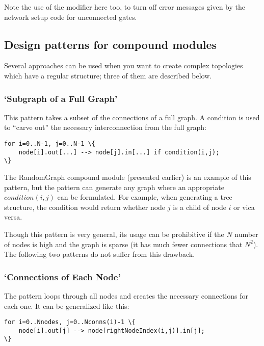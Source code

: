 Note the use of the  modifier
here too, to turn off error messages given by the network setup code
for unconnected gates.


\subsection{Design patterns for compound modules}


Several approaches can be used when you want to create complex
topologies which have a regular structure; three of them are
described below.


\subsubsection{`Subgraph of a Full Graph'}


This pattern takes a subset of the connections of a full graph.  A
condition is used to ``carve out'' the necessary interconnection from
the full graph:

\begin{Verbatim}[commandchars=\\\{\}]
for i=0..N-1, j=0..N-1 \{
    node[i].out[...] --> node[j].in[...] if condition(i,j);
\}
\end{Verbatim}

The RandomGraph compound module (presented earlier) is an example of
this pattern, but the pattern can generate any graph where an
appropriate $condition(i,j)$ can be formulated. For example,
when generating a tree structure, the condition
would return whether node $j$ is a child of node $i$ or
vica versa.

Though this pattern is very general, its usage can be prohibitive if
the $N$ number of nodes is high and the graph is sparse (it has
much fewer connections that $N^2$). The following
two patterns do not suffer from this drawback.


\subsubsection{`Connections of Each Node'}

The pattern loops through all nodes and creates the necessary
connections for each one. It can be generalized like this:

\begin{Verbatim}[commandchars=\\\{\}]
for i=0..Nnodes, j=0..Nconns(i)-1 \{
    node[i].out[j] --> node[rightNodeIndex(i,j)].in[j];
\}
\end{Verbatim}

